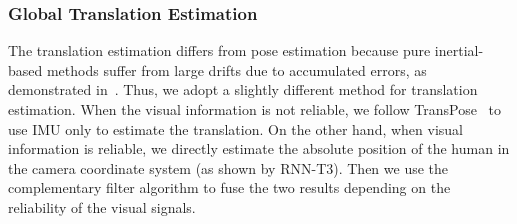 \subsubsection{Global Translation Estimation}\label{subsubsec:Tran}
%
The translation estimation differs from pose estimation because pure inertial-based methods suffer from large drifts due to accumulated errors, as demonstrated in~\cite{EgoLocate}.
%
Thus, we adopt a slightly different method for translation estimation.
%
When the visual information is not reliable, we follow TransPose~\cite{TransPose} to use IMU only to estimate the translation. 
%
%
%
On the other hand, when visual information is reliable, we directly estimate the absolute position of the human in the camera coordinate system (as shown by RNN-T3).
Then we use the complementary filter algorithm to fuse the two results depending on the reliability of the visual signals.
%
%
%
%
%

